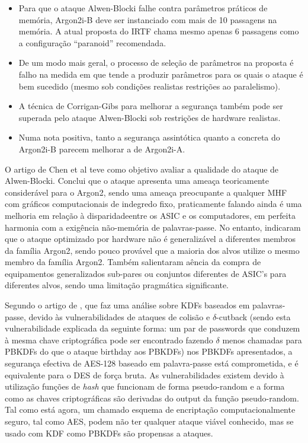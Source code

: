 \documentclass[conference]{IEEEtran}
\begin{document}
\begin{itemize}
\item Para que o ataque Alwen-Blocki falhe contra parâmetros práticos de memória, Argon2i-B
deve ser instanciado com mais de 10 passagens na memória. A atual proposta do IRTF chama
mesmo apenas 6 passagens como a configuração ``paranoid'' recomendada.
\item De um modo mais geral, o processo de seleção de parâmetros na proposta é falho na medida em que
tende a produzir parâmetros para os quais o ataque é bem sucedido (mesmo sob condições realistas
restrições ao paralelismo).
\item A técnica de Corrigan-Gibs para melhorar a segurança também pode ser superada
pelo ataque Alwen-Blocki sob restrições de hardware realistas.
\item Numa nota positiva, tanto a segurança assintótica quanto a concreta do Argon2i-B parecem melhorar 
a de Argon2i-A.
\end{itemize}

O artigo de Chen et al \cite{chen2017investigation} teve como objetivo avaliar a qualidade do 
ataque de Alwen-Blocki. Conclui que o ataque apresenta uma ameaça teoricamente considerável 
para o Argon2, sendo uma ameaça preocupante a qualquer MHF com gráficos computacionais 
de indegredo fixo, praticamente falando ainda é uma melhoria em relação à disparidadeentre 
os ASIC e os computadores, em perfeita harmonia com a exigência não-memória de palavras-passe. 
No entanto, indicaram que o ataque optimizado por hardware não é generalizável a diferentes 
membros da família Argon2, sendo pouco provável que a maioria dos alvos utilize o mesmo 
membro da família Argon2. Também salientaram aência da compra de equipamentos generalizados 
sub-pares ou conjuntos diferentes de ASIC's para diferentes alvos, sendo uma limitação 
pragmática significante.

Segundo o artigo de \cite{Kodwani2021}, que faz uma análise sobre KDFs baseados em palavras-passe, 
devido às vulnerabilidades de ataques de colisão e $\delta$-cutback (sendo esta 
vulnerabilidade explicada da seguinte forma: um par de passwords que conduzem à mesma 
chave criptográfica pode ser encontrado fazendo $\delta$ menos chamadas para PBKDFs do 
que o ataque birthday aos PBKDFs) nos PBKDFs apresentados, a segurança efectiva 
de AES-128 baseado em palavra-passe está comprometida, e é equivalente para o 
DES de força bruta. As vulnerabilidades existem devido à utilização funções de 
\textit{hash} que funcionam de forma pseudo-random e a forma como as chaves criptográficas 
são derivadas do output da função pseudo-random. Tal como está agora,
um chamado esquema de encriptação computacionalmente seguro, tal como
AES, podem não ter qualquer ataque viável conhecido, mas se usado com
KDF como PBKDFs são propensas a ataques.
\end{document}
